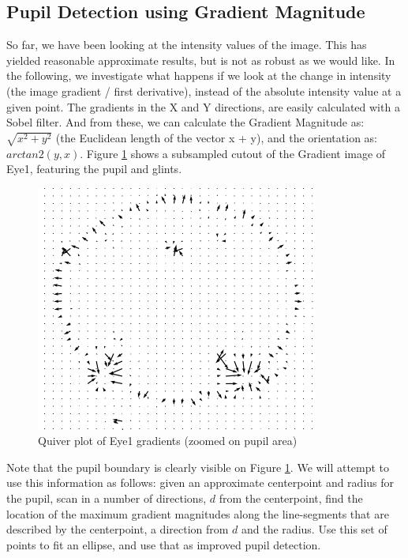 \documentclass[a4paper,11pt]{article}
\begin{document}
\subsection{Pupil Detection using Gradient Magnitude}
So far, we have been looking at the intensity values of the image. This has yielded reasonable approximate results, but is not as robust as we would like. In the following, we investigate what happens if we look at the change in intensity (the image gradient / first derivative), instead of the absolute intensity value at a given point.
The gradients in the X and Y directions, are easily calculated with a Sobel filter. And from these, we can calculate the Gradient Magnitude as: $\sqrt{x^2 + y^2}$ (the Euclidean length of the vector x + y), and the orientation as: $arctan2(y, x)$. Figure \ref{fig:quiver} shows a subsampled cutout of the Gradient image of Eye1, featuring the pupil and glints.

\begin{figure}[ht]
  \centering
  \includegraphics[scale=0.5]{quiver_cutout}
  \caption{Quiver plot of Eye1 gradients (zoomed on pupil area)}
  \label{fig:quiver}
\end{figure}

Note that the pupil boundary is clearly visible on Figure \ref{fig:quiver}. We will attempt to use this information as follows: given an approximate centerpoint and radius for the pupil, scan in a number of directions, $d$ from the centerpoint, find the location of the maximum gradient magnitudes along the line-segments that are described by the centerpoint, a direction from $d$ and the radius. Use this set of points to fit an ellipse, and use that as improved pupil detection.
\end{document}
